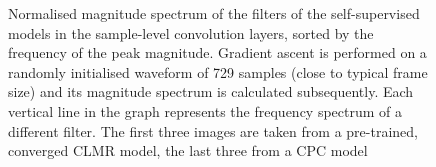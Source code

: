 \begin{figure}
    \caption{Normalised magnitude spectrum of the filters of the self-supervised models in the sample-level convolution layers, sorted by the frequency of the peak magnitude. Gradient ascent is performed on a randomly initialised waveform of 729 samples (close to typical frame size) and its magnitude spectrum is calculated subsequently. Each vertical line in the graph represents the frequency spectrum of a different filter. The first three images are taken from a pre-trained, converged CLMR model, the last three from a CPC model}
    \label{fig:filter_visualisation}
\end{figure}

\begin{figure}
    \centering
    \hfill
    \hfill


\end{figure}
